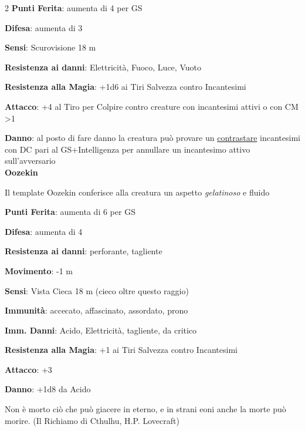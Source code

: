 \begin{multicols}{2}
\textbf{Punti Ferita}: aumenta di 4 per GS

\textbf{Difesa}: aumenta di 3

\textbf{Sensi}: Scurovisione 18 m

\textbf{Resistenza ai danni}:  Elettricità, Fuoco, Luce, Vuoto

\textbf{Resistenza alla Magia}: +1d6 ai Tiri Salvezza contro Incantesimi

\textbf{Attacco}: +4 al Tiro per Colpire contro creature con incantesimi attivi o con CM >1

\textbf{Danno}: al posto di fare danno la creatura può provare un \hyperlink{contrastareincantesimi}{contrastare} incantesimi con DC pari al GS+Intelligenza per annullare un incantesimo attivo sull'avversario\\

\textbf{Oozekin}

Il template Oozekin conferisce alla creatura un aspetto \emph{gelatinoso} e fluido

\textbf{Punti Ferita}: aumenta di 6 per GS

\textbf{Difesa}: aumenta di 4

\textbf{Resistenza ai danni}:  perforante, tagliente

\textbf{Movimento}: -1 m

\textbf{Sensi}: Vista Cieca 18 m (cieco oltre questo raggio)

\textbf{Immunità}: accecato, affascinato, assordato, prono

\textbf{Imm. Danni}: Acido, Elettricità, tagliente, da critico

\textbf{Resistenza alla Magia}: +1 ai Tiri Salvezza contro Incantesimi

\textbf{Attacco}: +3

\textbf{Danno}: +1d8 da Acido

\end{multicols}


\begin{enfasi}

Non è morto ciò che può giacere in eterno, e in strani eoni anche la morte può morire. (Il Richiamo di Cthulhu, H.P. Lovecraft)

\end{enfasi}




